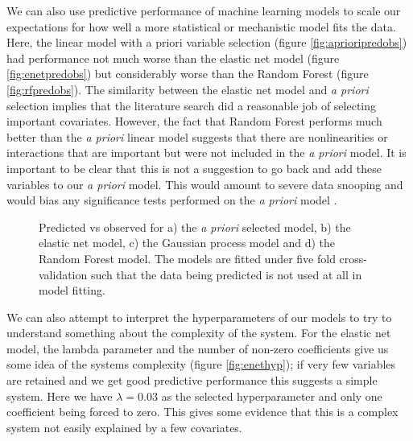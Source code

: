 \documentclass[10pt,]{article}
\begin{document}
We can also use predictive performance of machine learning models to scale our expectations for how well a more statistical or mechanistic model fits the data.
Here, the linear model with a priori variable selection (figure \ref{fig:aprioripredobs}) had performance not much worse than the elastic net model (figure \ref{fig:enetpredobs}) but considerably worse than the Random Forest (figure \ref{fig:rfpredobs}).
The similarity between the elastic net model and \emph{a priori} selection implies that the literature search did a reasonable job of selecting important covariates.
However, the fact that Random Forest performs much better than the \emph{a priori} linear model suggests that there are nonlinearities or interactions that are important but were not included in the \emph{a priori} model.
It is important to be clear that this is not a suggestion to go back and add these variables to our \emph{a priori} model.
This would amount to severe data snooping and would bias any significance tests performed on the \emph{a priori} model \citep{white2000reality}.



\begin{figure}[t!]
  \centering

  \label{fig:predobs}
  \caption{
    Predicted vs observed for a) the \emph{a priori} selected model, b) the elastic net model, c) the Gaussian process model and d) the Random Forest model.
    The models are fitted under five fold cross-validation such that the data being predicted is not used at all in model fitting.
  }
\end{figure}

We can also attempt to interpret the hyperparameters of our models to try to understand something about the complexity of the system.
For the elastic net model, the lambda parameter and the number of non-zero coefficients give us some idea of the systems complexity (figure \ref{fig:enethyp}); if very few variables are retained and we get good predictive performance this suggests a simple system.
Here we have \(\lambda = 0.03\) as the selected hyperparameter and only one coefficient being forced to zero.
This gives some evidence that this is a complex system not easily explained by a few covariates.
\end{document}
